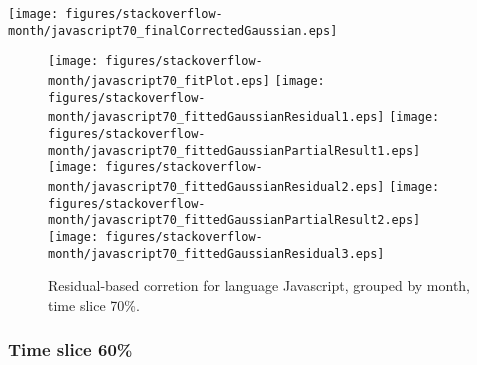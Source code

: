 \begin{center}
{\texttt{[image: figures/stackoverflow-month/javascript70\_finalCorrectedGaussian.eps]}}
\end{center}

\FloatBarrier

\begin{figure}[t]
\centering
{}
{\texttt{[image: figures/stackoverflow-month/javascript70\_fitPlot.eps]}}
{\texttt{[image: figures/stackoverflow-month/javascript70\_fittedGaussianResidual1.eps]}}
{\texttt{[image: figures/stackoverflow-month/javascript70\_fittedGaussianPartialResult1.eps]}}
{\texttt{[image: figures/stackoverflow-month/javascript70\_fittedGaussianResidual2.eps]}}
{\texttt{[image: figures/stackoverflow-month/javascript70\_fittedGaussianPartialResult2.eps]}}
{\texttt{[image: figures/stackoverflow-month/javascript70\_fittedGaussianResidual3.eps]}}
\caption{Residual-based corretion for language Javascript, grouped by month, time slice 70\%.}
\end{figure}


\FloatBarrier


\subsubsection{Time slice 60\%}

